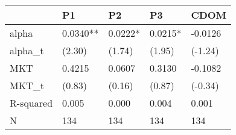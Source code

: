 \begin{tabular}{lllll}
\toprule
 & P1 & P2 & P3 & CDOM \\
\midrule
alpha & 0.0340** & 0.0222* & 0.0215* & -0.0126 \\
alpha_t & (2.30) & (1.74) & (1.95) & (-1.24) \\
MKT & 0.4215 & 0.0607 & 0.3130 & -0.1082 \\
MKT_t & (0.83) & (0.16) & (0.87) & (-0.34) \\
R-squared & 0.005 & 0.000 & 0.004 & 0.001 \\
N & 134 & 134 & 134 & 134 \\
\bottomrule
\end{tabular}

